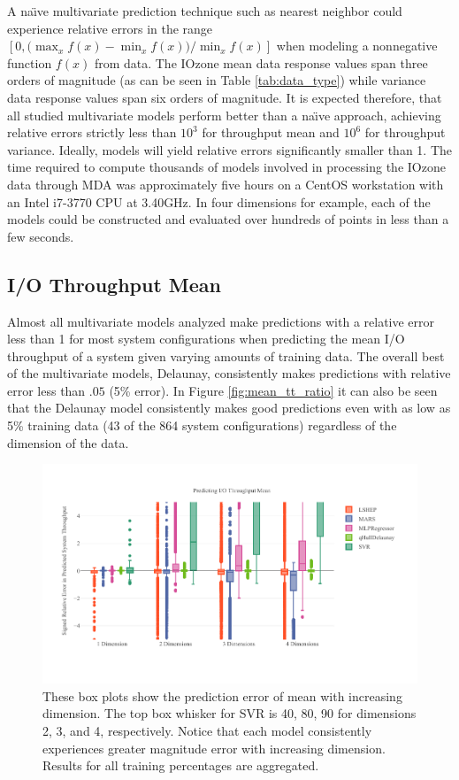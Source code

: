 A na\"{\i}ve multivariate prediction technique such as nearest
neighbor could experience relative errors in the range $\displaystyle
[0, \big(\max_x f(x) - \min_x f(x)\big) / \min_x f(x) ]$ when modeling
a nonnegative function $f(x)$ from data. The IOzone mean data response
values span three orders of magnitude (as can be seen in Table
\ref{tab:data_type}) while variance data response values span six
orders of magnitude. It is expected therefore, that all studied
multivariate models perform better than a na\"{\i}ve approach,
achieving relative errors strictly less than $10^3$ for throughput
mean and $10^6$ for throughput variance. Ideally, models will yield
relative errors significantly smaller than 1. The time required to
compute thousands of models involved in processing the IOzone data
through MDA was approximately five hours on a CentOS workstation with
an Intel i7-3770 CPU at 3.40GHz. In four dimensions for example, each
of the models could be constructed and evaluated over hundreds of
points in less than a few seconds.


\subsection{I/O Throughput Mean}

Almost all multivariate models analyzed make predictions with a
relative error less than 1 for most system configurations when
predicting the mean I/O throughput of a system given varying amounts
of training data. The overall best of the multivariate models,
Delaunay, consistently makes predictions with relative error less than
$.05$ (5\% error). In Figure \ref{fig:mean_tt_ratio} it can also be
seen that the Delaunay model consistently makes good predictions even
with as low as 5\% training data (43 of the 864 system configurations)
regardless of the dimension of the data.

\begin{figure}
  \centering
  \includegraphics[width=\textwidth,trim={0 .5in 0 .3in}]{Figures/HPC/Mean_Dim.pdf}
  \caption{These box plots show the prediction error of mean with
    increasing dimension. The top box whisker for SVR is 40, 80, 90
    for dimensions 2, 3, and 4, respectively. Notice that each model
    consistently experiences greater magnitude error with increasing
    dimension. Results for all training percentages are aggregated.}
  \label{fig:mean_dim}
\end{figure}

